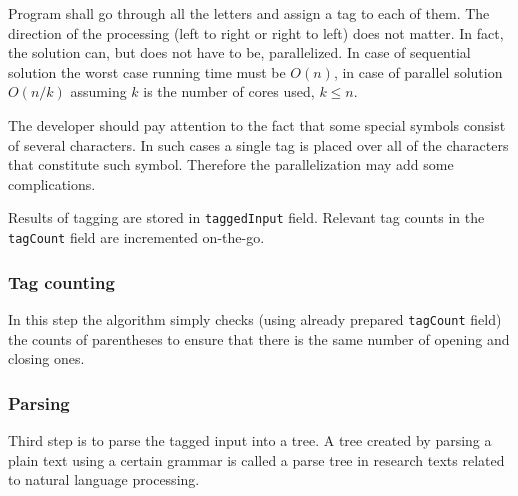 \documentclass{article}
\begin{document}
Program shall go through all the letters and assign a tag to each of them. The direction of the
processing (left to right or right to left) does not matter. In fact, the solution can, but does not
have to be, parallelized. In case of sequential solution the worst case running time must be $O(n)$,
in case of parallel solution $O(n/k)$ assuming $k$ is the number of cores used, $k \leq n$.

The developer should pay attention to the fact that some special symbols consist of several
characters. In such cases a single tag is placed over all of the characters that constitute such
symbol. Therefore the parallelization may add some complications.

Results of tagging are stored in \verb|taggedInput| field. Relevant tag counts in the
\verb|tagCount| field are incremented on-the-go.

\subsubsection{Tag counting}
In this step the algorithm simply checks (using already prepared \verb|tagCount| field) the counts
of parentheses to ensure that there is the same number of opening and closing ones.

\subsubsection{Parsing}
Third step is to parse the tagged input into a tree. A tree created by parsing a plain text using a
certain grammar is called a parse tree in research texts related to natural language processing.
\end{document}
